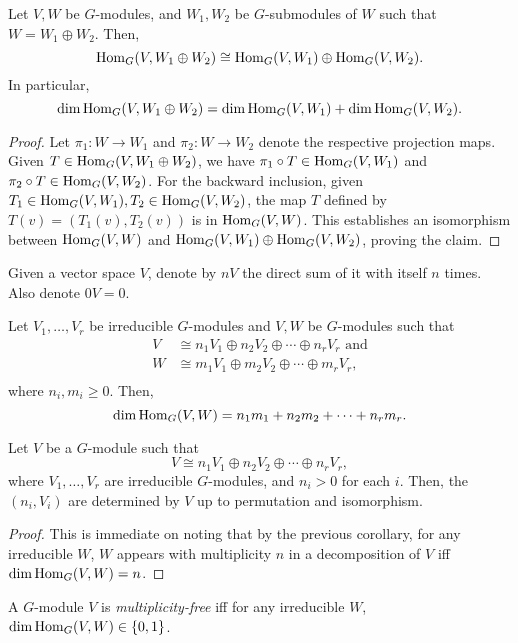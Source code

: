 	\begin{flem}
		Let $V,W$ be $G$-modules, and $W_1,W_2$ be $G$-submodules of $W$ such that $W = W_1 \oplus W_2$. Then,
		\[ \operatorname{Hom}_G(V,W_1\oplus W_2) \cong \operatorname{Hom}_G(V,W_1) \oplus \operatorname{Hom}_G(V,W_2). \]
		In particular,
		\[ \dim \operatorname{Hom}_G(V,W_1 \oplus W_2) = \dim \operatorname{Hom}_G(V,W_1) + \dim \operatorname{Hom}_G(V,W_2). \]
	\end{flem}
	\begin{proof}
		Let $\pi_1 : W \to W_1$ and $\pi_2 : W \to W_2$ denote the respective projection maps. Given $T \in \operatorname{Hom}_G(V,W_1\oplus W_2)$, we have $\pi_1 \circ T \in \operatorname{Hom}_G(V,W_1)$ and $\pi_2 \circ T \in \operatorname{Hom}_G(V,W_2)$. For the backward inclusion, given $T_1 \in \operatorname{Hom}_G(V,W_1), T_2 \in \operatorname{Hom}_G(V,W_2)$, the map $T$ defined by $T(v) = (T_1(v),T_2(v))$ is in $\operatorname{Hom}_G(V,W)$. This establishes an isomorphism between $\operatorname{Hom}_G(V,W)$ and $\operatorname{Hom}_G(V,W_1) \oplus \operatorname{Hom}_G(V,W_2)$, proving the claim.
	\end{proof}

	Given a vector space $V$, denote by $nV$ the direct sum of it with itself $n$ times. Also denote $0V = 0$.

	\begin{fcor}
		Let $V_1,\ldots,V_r$ be irreducible $G$-modules and $V,W$ be $G$-modules such that
		\begin{align*}
			V &\cong n_1V_1 \oplus n_2V_2 \oplus \cdots \oplus n_rV_r \text{ and} \\
			W &\cong m_1V_1 \oplus m_2V_2 \oplus \cdots \oplus m_rV_r, \\
		\end{align*} 
		where $n_i,m_i \ge 0$. Then,
		\[ \dim \operatorname{Hom}_G(V,W) = n_1m_1 + n_2m_2 + \cdots + n_rm_r. \]
	\end{fcor}

	\begin{fcor}
		Let $V$ be a $G$-module such that
		\[ V \cong n_1V_1 \oplus n_2V_2 \oplus \cdots \oplus n_rV_r, \]
		where $V_1,\ldots,V_r$ are irreducible $G$-modules, and $n_i > 0$ for each $i$. Then, the $(n_i,V_i)$ are determined by $V$ up to permutation and isomorphism. 
	\end{fcor}
	\begin{proof}
		This is immediate on noting that by the previous corollary, for any irreducible $W$, $W$ appears with multiplicity $n$ in a decomposition of $V$ iff $\dim \operatorname{Hom}_G(V,W) = n$.
	\end{proof}

	\begin{fdef}
		A $G$-module $V$ is \emph{multiplicity-free} iff for any irreducible $W$, $\dim \operatorname{Hom}_G(V,W) \in \{0,1\}$.
	\end{fdef}

